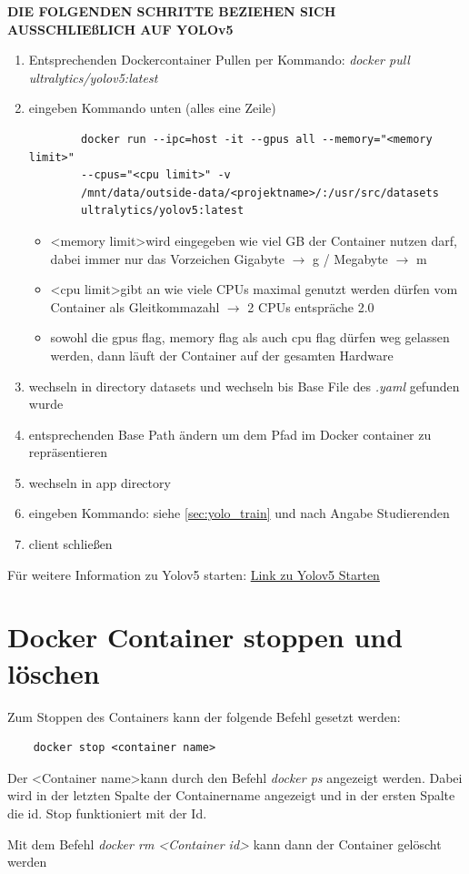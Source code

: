 \textbf{DIE FOLGENDEN SCHRITTE BEZIEHEN SICH AUSSCHLIEßLICH AUF YOLOv5}
\begin{enumerate}
    \item Entsprechenden Dockercontainer Pullen per Kommando: \textit{docker pull ultralytics/yolov5:latest} 
    \item eingeben Kommando unten (alles eine Zeile)
    \begin{verbatim}
        docker run --ipc=host -it --gpus all --memory="<memory limit>"
        --cpus="<cpu limit>" -v 
        /mnt/data/outside-data/<projektname>/:/usr/src/datasets
        ultralytics/yolov5:latest
    \end{verbatim}
    \begin{itemize}
        \item \textless memory limit\textgreater  wird eingegeben wie viel GB der Container nutzen darf, dabei immer nur das Vorzeichen Gigabyte  $\rightarrow$ g / Megabyte $\rightarrow$ m
        \item \textless cpu limit\textgreater gibt an wie viele CPUs maximal genutzt werden dürfen vom Container als Gleitkommazahl $\rightarrow$ 2 CPUs entspräche 2.0
        \item sowohl die gpus flag, memory flag als auch cpu flag dürfen weg gelassen werden, dann läuft der Container auf der gesamten Hardware    
    \end{itemize}
    \item wechseln in directory datasets und wechseln bis Base File des \textit{.yaml} gefunden wurde
    \item entsprechenden Base Path ändern um dem Pfad im Docker container zu repräsentieren
    \item wechseln in app directory
    \item eingeben Kommando: siehe \autoref{sec:yolo_train} und nach Angabe Studierenden
    \item client schließen

\end{enumerate}
Für weitere Information zu Yolov5 starten: \href{https://github.com/ultralytics/yolov5/wiki/Docker-Quickstart}{Link zu Yolov5 Starten} 

\section{Docker Container stoppen und löschen}
Zum Stoppen des Containers kann der folgende Befehl gesetzt werden:
\begin{verbatim}
    docker stop <container name>
\end{verbatim}
Der \textless Container name\textgreater kann durch den Befehl \textit{docker ps} angezeigt werden. Dabei wird in der letzten Spalte der Containername angezeigt und in der ersten Spalte die id. Stop funktioniert mit der Id.

Mit dem Befehl \textit{docker rm \textless Container id\textgreater} kann dann der Container gelöscht werden
